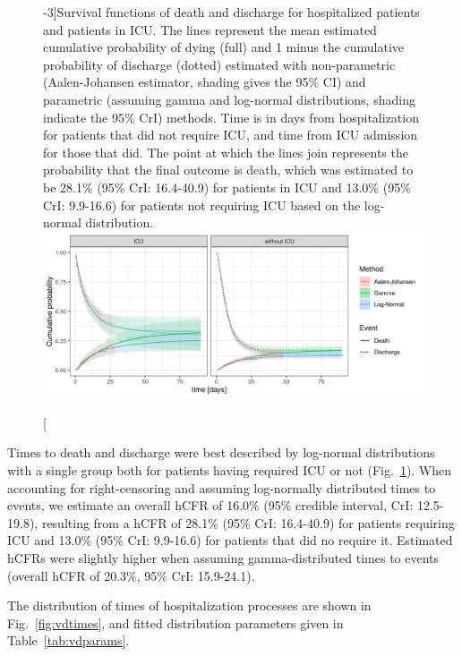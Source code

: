 \begin{figure}[!htb]
    \centering
        \caption[Survival functions of death and discharge for hospitalized patients and patients in ICU][-3\baselineskip]{Survival functions of death and discharge for hospitalized patients and patients in ICU. The lines represent the mean estimated cumulative probability of dying (full) and 1 minus the cumulative probability of discharge (dotted) estimated with non-parametric (Aalen-Johansen estimator, shading gives the 95\% CI) and parametric (assuming gamma and log-normal distributions, shading indicate the 95\% CrI) methods. Time is in days from hospitalization for patients that did not require ICU, and time from ICU admission for those that did. The point at which the lines join represents the probability that the final outcome is death, which was estimated to be 28.1\% (95\% CrI: 16.4-40.9) for patients in ICU and 13.0\% (95\% CrI: 9.9-16.6) for patients not requiring ICU based on the log-normal distribution.}
    \includegraphics{fig_covid-switzerland-npi/fig_supp/survival_analaysis.png}
    \label{fig:delays}
\end{figure}


Times to death and discharge were best described by log-normal distributions with a single group both for patients having required ICU or not (Fig.~\ref{fig:delays}). When accounting for right-censoring and assuming log-normally distributed times to events, we estimate an overall hCFR of 16.0\% (95\% credible interval, CrI: 12.5-19.8), resulting from a hCFR of 28.1\% (95\% CrI: 16.4-40.9) for patients requiring ICU and 13.0\% (95\% CrI: 9.9-16.6) for patients that did no require it. Estimated hCFRs were slightly higher when assuming gamma-distributed times to events (overall hCFR of 20.3\%, 95\% CrI: 15.9-24.1).


\noindent The distribution of times of hospitalization processes are shown in Fig.~\ref{fig:vdtimes}, and fitted distribution parameters given in Table~\ref{tab:vdparams}.


